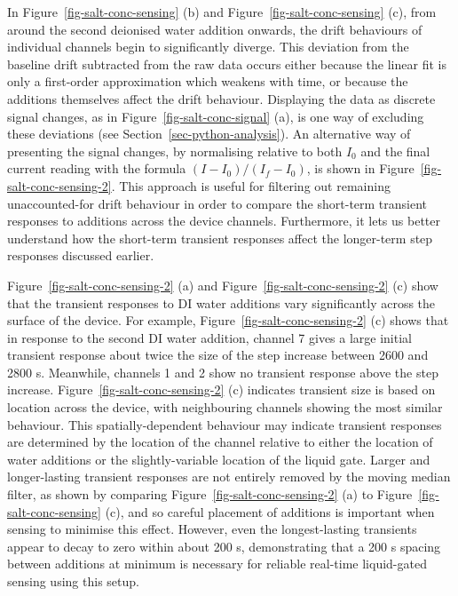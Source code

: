 \documentclass[
  letterpaper,
  DIV=11,
  numbers=noendperiod]{scrartcl}
\begin{document}
In Figure~\ref{fig-salt-conc-sensing} (b) and
Figure~\ref{fig-salt-conc-sensing} (c), from around the second deionised
water addition onwards, the drift behaviours of individual channels
begin to significantly diverge. This deviation from the baseline drift
subtracted from the raw data occurs either because the linear fit is
only a first-order approximation which weakens with time, or because the
additions themselves affect the drift behaviour. Displaying the data as
discrete signal changes, as in Figure~\ref{fig-salt-conc-signal} (a), is
one way of excluding these deviations (see
Section~\ref{sec-python-analysis}). An alternative way of presenting the
signal changes, by normalising relative to both \(I_{0}\) and the final
current reading with the formula \((I - I_{0})/(I_{f} - I_{0})\), is
shown in Figure~\ref{fig-salt-conc-sensing-2}. This approach is useful
for filtering out remaining unaccounted-for drift behaviour in order to
compare the short-term transient responses to additions across the
device channels. Furthermore, it lets us better understand how the
short-term transient responses affect the longer-term step responses
discussed earlier.

Figure~\ref{fig-salt-conc-sensing-2} (a) and
Figure~\ref{fig-salt-conc-sensing-2} (c) show that the transient
responses to DI water additions vary significantly across the surface of
the device. For example, Figure~\ref{fig-salt-conc-sensing-2} (c) shows
that in response to the second DI water addition, channel 7 gives a
large initial transient response about twice the size of the step
increase between 2600 and 2800 s. Meanwhile, channels 1 and 2 show no
transient response above the step increase.
Figure~\ref{fig-salt-conc-sensing-2} (c) indicates transient size is
based on location across the device, with neighbouring channels showing
the most similar behaviour. This spatially-dependent behaviour may
indicate transient responses are determined by the location of the
channel relative to either the location of water additions or the
slightly-variable location of the liquid gate. Larger and longer-lasting
transient responses are not entirely removed by the moving median
filter, as shown by comparing Figure~\ref{fig-salt-conc-sensing-2} (a)
to Figure~\ref{fig-salt-conc-sensing} (c), and so careful placement of
additions is important when sensing to minimise this effect. However,
even the longest-lasting transients appear to decay to zero within about
200 s, demonstrating that a 200 s spacing between additions at minimum
is necessary for reliable real-time liquid-gated sensing using this
setup.
\end{document}
